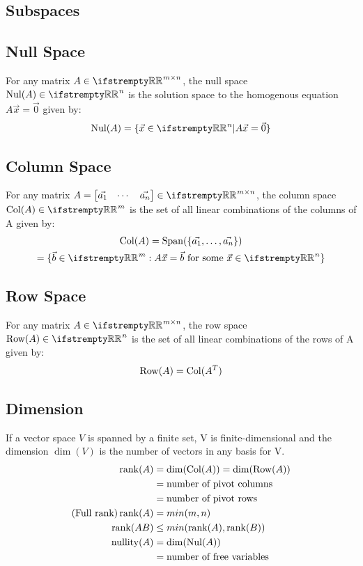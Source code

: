 \documentclass[12pt, a4paper]{article}
\begin{document}
\begin{multicols*}{3}
\section{Subspaces}

\subsection{Null Space}
For any matrix $A \in \RR^{m{\times}n}$, the null space $\nul(A) \in \RR^n$ is the solution space to the homogenous equation $A\vec{x} = \vec{0}$ given by:
\begin{align*}
  \nul(A) = \{\vec{x} \in \RR^n | A\vec{x} = \vec{0}\}
\end{align*}

\subsection{Column Space}
For any matrix $A = \begin{bmatrix}\vec{a_1} & \cdots & \vec{a_n}\end{bmatrix} \in \RR^{m{\times}n}$, the column space $\col(A) \in \RR^m$ is the set of all linear combinations of the columns of A given by:
\begin{gather*}
  \col(A) = \Span(\{\vec{a_1},\ldots,\vec{a_n}\}) \\
          = \{\vec{b} \in \RR^m : A\vec{x} = \vec{b} \text{ for some }\vec{x} \in \RR^n\}
\end{gather*}

\subsection{Row Space}
For any matrix $A \in \RR^{m{\times}n}$, the row space $\row(A) \in \RR^n$ is the set of all linear combinations of the rows of A given by:
\begin{align*}
  \operatorname{Row}(A) = \operatorname{Col}(A^T)
\end{align*}

\subsection{Dimension}
If a vector space $V$ is spanned by a finite set, V is finite-dimensional and the dimension $\dim(V)$ is the number of vectors in any basis for V.
\begin{align*}
  \operatorname{rank}(A) &= \dim(\operatorname{Col}(A)) = \dim(\operatorname{Row}(A)) \\
           &= \text{number of pivot columns} \\ 
           &= \text{number of pivot rows} \\
  \text{(Full rank)} \operatorname{rank}(A) &= min(m, n)\\
  \operatorname{rank}(AB) &\leq min(\operatorname{rank}(A), \operatorname{rank}(B))\\
  \operatorname{nullity}(A) &= \dim(\operatorname{Nul}(A)) \\
              &= \text{number of free variables}
\end{align*}


\end{multicols*}
\end{document}
